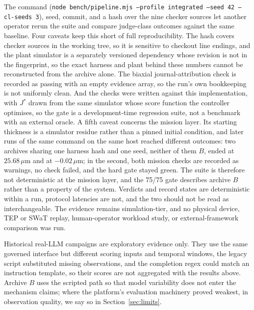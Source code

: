 The command
(\texttt{node bench/pipeline.mjs --profile integrated --seed 42 --cl-seeds 3}),
seed, commit, and a hash over the nine checker sources let another operator rerun
the suite and compare judge-class outcomes against the same baseline. Four caveats
keep this short of full reproducibility. The hash covers checker sources in the
working tree, so it is sensitive to checkout line endings, and the plant simulator
is a separately versioned dependency whose revision is not in the fingerprint, so
the exact harness and plant behind these numbers cannot be reconstructed from the
archive alone. The biaxial journal-attribution check is recorded as passing with an
empty evidence array, so the run's own bookkeeping is not uniformly clean. And the
checks were written against this implementation, with $J^{*}$ drawn from the same
simulator whose score function the controller optimises, so the gate is a
development-time regression suite, not a benchmark with an external oracle. A fifth caveat concerns the mission layer. Its starting thickness is a simulator residue rather than a pinned initial condition, and later runs of the same command on the same host reached different outcomes: two archives sharing one harness hash and one seed, neither of them $B$, ended at $25.68\,\mu$m and at $-0.02\,\mu$m; in the second, both mission checks are recorded as warnings, no check failed, and the hard gate stayed green. The suite is therefore not deterministic at the mission layer, and the 75/75 gate describes archive $B$ rather than a property of the system. Verdicts and record states are deterministic within a run, protocol latencies are not, and the two should not be read as interchangeable. The evidence remains simulation-tier, and no
physical device, TEP or SWaT replay, human-operator workload study, or
external-framework comparison was run.

Historical real-LLM campaigns are exploratory evidence only. They use the same
governed interface but different scoring inputs and temporal windows, the legacy
script substituted missing observations, and the completion regex could match an
instruction template, so their scores are not aggregated with the results above.
Archive $B$ uses the scripted path so that model variability does not enter the
mechanism claims; where the platform's evaluation machinery proved weakest, in
observation quality, we say so in Section~\ref{sec:limits}.
